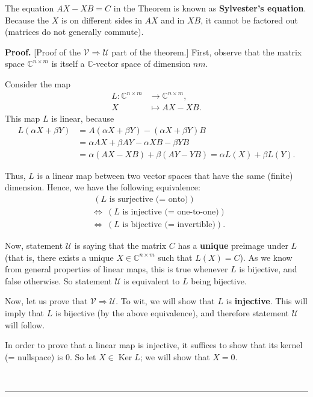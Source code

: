 \documentclass[numbers=enddot,12pt,final,onecolumn,notitlepage]{scrartcl}%
\numberwithin{exer}{subsection}
\theoremstyle{definition}
\newenvironment{proof}[1][Proof]{\noindent\textbf{#1.} }{\ \rule{0.5em}{0.5em}}
\begin{document}
The equation $AX-XB=C$ in the Theorem is known as \textbf{Sylvester's
equation}. Because the $X$ is on different sides in $AX$ and in $XB$, it
cannot be factored out (matrices do not generally commute).

\begin{proof}
[Proof of the $\mathcal{V}\Longrightarrow\mathcal{U}$ part of the theorem.]
First, observe that the matrix space $\mathbb{C}^{n\times m}$ is itself a
$\mathbb{C}$-vector space of dimension $nm$.

Consider the map%
\begin{align*}
L:\mathbb{C}^{n\times m}  & \rightarrow\mathbb{C}^{n\times m},\\
X  & \mapsto AX-XB.
\end{align*}
This map $L$ is linear, because%
\begin{align*}
L\left(  \alpha X+\beta Y\right)    & =A\left(  \alpha X+\beta Y\right)
-\left(  \alpha X+\beta Y\right)  B\\
& =\alpha AX+\beta AY-\alpha XB-\beta YB\\
& =\alpha\left(  AX-XB\right)  +\beta\left(  AY-YB\right)  =\alpha L\left(
X\right)  +\beta L\left(  Y\right)  .
\end{align*}


Thus, $L$ is a linear map between two vector spaces that have the same
(finite) dimension. Hence, we have the following equivalence:
\begin{align*}
& \ \left(  L\text{ is surjective (= onto)}\right)  \\
& \Longleftrightarrow\ \left(  L\text{ is injective (= one-to-one)}\right)
\ \\
& \Longleftrightarrow\ \left(  L\text{ is bijective (= invertible)}\right)  .
\end{align*}


Now, statement $\mathcal{U}$ is saying that the matrix $C$ has a
\textbf{unique} preimage under $L$ (that is, there exists a unique
$X\in\mathbb{C}^{n\times m}$ such that $L\left(  X\right)  =C$). As we know
from general properties of linear maps, this is true whenever $L$ is
bijective, and false otherwise. So statement $\mathcal{U}$ is equivalent to
$L$ being bijective.

Now, let us prove that $\mathcal{V}\Longrightarrow\mathcal{U}$. To wit, we
will show that $L$ is \textbf{injective}. This will imply that $L$ is
bijective (by the above equivalence), and therefore statement $\mathcal{U}$
will follow.

In order to prove that a linear map is injective, it suffices to show that its
kernel (= nullspace) is $0$. So let $X\in\operatorname*{Ker}L$; we will show
that $X=0$.


\end{proof}
\end{document}
